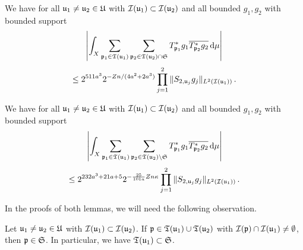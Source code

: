 \begin{lemma}
        \label{correlation-distant-tree-parts}
        \leanok
        We have for all ${\mathfrak u}_1 \ne {\mathfrak u}_2 \in {\mathfrak U}$ with ${\mathcal{I}}({\mathfrak u}_1) \subset {\mathcal{I}}({\mathfrak u}_2)$ and all bounded $g_1, g_2$ with bounded support
      \begin{equation}
            \label{eq-lhs-big-sep-tree}
            \left| \int_X \sum_{{\mathfrak p}_1 \in {\mathfrak T}({\mathfrak u}_1)} \sum_{{\mathfrak p}_2 \in {\mathfrak T}({\mathfrak u}_2) \cap \mathfrak{S}} T^*_{{\mathfrak p}_1}g_1 \overline{T^*_{{\mathfrak p}_2}g_2 }\,\mathrm{d}\mu \right|
        \end{equation}
      \begin{equation}
            \label{eq-rhs-big-sep-tree}
            \le 2^{511a^3} 2^{-Zn/(4a^2 + 2a^3)} \prod_{j =1}^2 \| S_{2, {\mathfrak u}_j} g_j\|_{L^2({\mathcal{I}}({\mathfrak u}_1))}\,.
        \end{equation}
    \end{lemma}
    \begin{lemma}
        \label{correlation-near-tree-parts}
        \leanok
        We have for all ${\mathfrak u}_1 \ne {\mathfrak u}_2 \in {\mathfrak U}$ with ${\mathcal{I}}({\mathfrak u}_1) \subset {\mathcal{I}}({\mathfrak u}_2)$ and all bounded $g_1, g_2$ with bounded support
      \begin{equation}
            \label{eq-lhs-small-sep-tree}
            \left| \int_X \sum_{{\mathfrak p}_1 \in {\mathfrak T}({\mathfrak u}_1)} \sum_{{\mathfrak p}_2 \in {\mathfrak T}({\mathfrak u}_2) \setminus \mathfrak{S}} T^*_{{\mathfrak p}_1}g_1 \overline{T^*_{{\mathfrak p}_2}g_2 }\,\mathrm{d}\mu \right|
        \end{equation}
      \begin{equation}
            \label{eq-rhs-small-sep-tree}
            \le 2^{232a^3+21a+5} 2^{-\frac{25}{101a}Zn\kappa} \prod_{j=1}^2 \|S_{2, {\mathfrak u}_j} g_j\|_{L^2({\mathcal{I}}({\mathfrak u}_1))}\,.
        \end{equation}
    \end{lemma}

In the proofs of both lemmas, we will need the following observation.

\begin{lemma}
    \label{overlap-implies-distance}
    \leanok
    Let ${\mathfrak u}_1 \ne {\mathfrak u}_2 \in {\mathfrak U}$ with ${\mathcal{I}}({\mathfrak u}_1) \subset {\mathcal{I}}({\mathfrak u}_2)$. If ${\mathfrak p} \in {\mathfrak T}({\mathfrak u}_1) \cup {\mathfrak T}({\mathfrak u}_2)$ with ${\mathcal{I}}({\mathfrak p}) \cap {\mathcal{I}}({\mathfrak u}_1) \ne \emptyset$, then ${\mathfrak p} \in \mathfrak{S}$. In particular, we have ${\mathfrak T}({\mathfrak u}_1) \subset \mathfrak{S}$.
\end{lemma}

